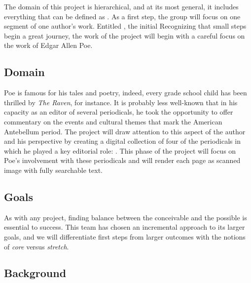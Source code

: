 The domain of this project is hierarchical, and at its most general, it includes everything that can be defined as \emph{\apc}. As a first step, the group will focus on one segment of one author's work. Entitled \projectname, the initial Recognizing that small steps begin a great journey, the work of the project will begin with a careful focus on the work of Edgar Allen Poe. 

\subsection{Domain}
Poe is famous for his tales and poetry, indeed, every grade school child has been thrilled by \emph{The Raven}, for instance. It is probably less well-known that in his capacity as an editor of several periodicals, he took the opportunity to offer commentary on the events and cultural themes that mark the American Antebellum period. The \projectname project will draw attention to this aspect of the author and his perspective by creating a digital collection of four of the periodicals in which he played a key editorial role: \maglist. This phase of the project will focus on Poe's involvement with these periodicals and will render each page as scanned image with fully searchable text.

\subsection{Goals}
As with any project, finding balance between the conceivable and the possible is essential to success. This team has chosen an incremental approach to its larger goals, and we will differentiate first steps from larger outcomes with the notions of \emph{core} versus \emph{stretch}.


\subsection{Background}



